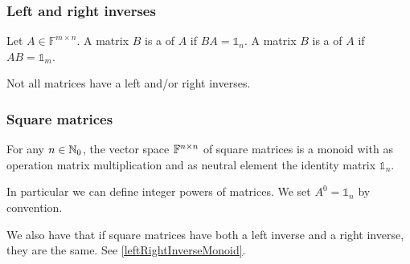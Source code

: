 \subsubsection{Left and right inverses}
\begin{definition}
Let $A\in \mathbb{F}^{m\times n}$. A matrix $B$ is a  of $A$ if $BA = \mathbb{1}_n$. A matrix $B$ is a  of $A$ if $AB = \mathbb{1}_m$.
\end{definition}
Not all matrices have a left and/or right inverses.

\subsubsection{Square matrices}
\begin{lemma}
For any $n\in\mathbb{N}_0$, the vector space $\mathbb{F}^{n\times n}$ of square matrices is a monoid with as operation matrix multiplication and as neutral element the identity matrix $\mathbb{1}_n$.
\end{lemma}

In particular we can define integer powers of matrices. We set $A^0 = \mathbb{1}_n$ by convention.

We also have that if square matrices have both a left inverse and a right inverse, they are the same. See \ref{leftRightInverseMonoid}.

